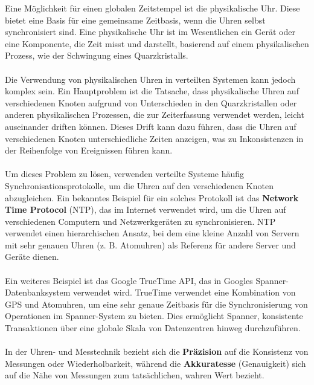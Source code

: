 \documentclass[../vs-script-first-v01.tex]{subfiles}
\begin{document}
Eine Möglichkeit für einen globalen Zeitstempel ist die physikalische Uhr. Diese bietet eine Basis für eine gemeinsame Zeitbasis, wenn die Uhren selbst synchronisiert sind. Eine physikalische Uhr ist im Wesentlichen ein Gerät oder eine Komponente, die Zeit misst und darstellt, basierend auf einem physikalischen Prozess, wie der Schwingung eines Quarzkristalls.
\\\\
Die Verwendung von physikalischen Uhren in verteilten Systemen kann jedoch komplex sein. Ein Hauptproblem ist die Tatsache, dass physikalische Uhren auf verschiedenen Knoten aufgrund von Unterschieden in den Quarzkristallen oder anderen physikalischen Prozessen, die zur Zeiterfassung verwendet werden, leicht auseinander driften können. Dieses Drift kann dazu führen, dass die Uhren auf verschiedenen Knoten unterschiedliche Zeiten anzeigen, was zu Inkonsistenzen in der Reihenfolge von Ereignissen führen kann.
\\\\
Um dieses Problem zu lösen, verwenden verteilte Systeme häufig Synchronisationsprotokolle, um die Uhren auf den verschiedenen Knoten abzugleichen. Ein bekanntes Beispiel für ein solches Protokoll ist das \textbf{Network Time Protocol} (NTP), das im Internet verwendet wird, um die Uhren auf verschiedenen Computern und Netzwerkgeräten zu synchronisieren. NTP verwendet einen hierarchischen Ansatz, bei dem eine kleine Anzahl von Servern mit sehr genauen Uhren (z. B. Atomuhren) als Referenz für andere Server und Geräte dienen.
\\\\
Ein weiteres Beispiel ist das Google TrueTime API, das in Googles Spanner-Datenbanksystem verwendet wird. TrueTime verwendet eine Kombination von GPS und Atomuhren, um eine sehr genaue Zeitbasis für die Synchronisierung von Operationen im Spanner-System zu bieten. Dies ermöglicht Spanner, konsistente Transaktionen über eine globale Skala von Datenzentren hinweg durchzuführen.
\\\\
In der Uhren- und Messtechnik bezieht sich die \textbf{Präzision} auf die Konsistenz von Messungen oder Wiederholbarkeit, während die \textbf{Akkuratesse} (Genauigkeit) sich auf die Nähe von Messungen zum tatsächlichen, wahren Wert bezieht.
\end{document}
